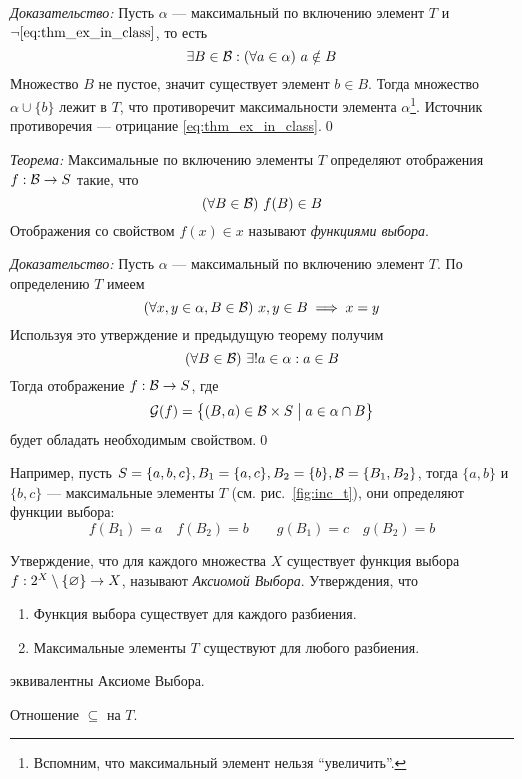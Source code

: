 {\it Доказательство:}
Пусть $\alpha$ --- максимальный по включению элемент $T$ и
$\lnot\eqref{eq:thm_ex_in_class}$, то есть
\[
  \exists B\in\mathcal B:(\forall a\in\alpha)~a\notin B
\]
Множество $B$ не пустое, значит существует элемент $b\in B$.
Тогда множество $\alpha\cup \{b\}$ лежит в $T$, что противоречит
максимальности элемента $\alpha$\footnote{Вспомним, что максимальный элемент
  нельзя ``увеличить''.}.
Источник противоречия --- отрицание \eqref{eq:thm_ex_in_class}.\qed

\vspace{1em}
{\it Теорема:} Максимальные по включению элементы $T$ определяют
отображения $f:\mathcal B\to S$ такие, что
\[
  (\forall B\in\mathcal B)~f(B)\in B
\]
Отображения со свойством $f(x)\in x$ называют {\it функциями выбора}.

{\it Доказательство:} Пусть $\alpha$ --- максимальный по включению
элемент $T$. По определению $T$ имеем
\[
  (\forall x,y\in\alpha,B\in\mathcal B)~x,y\in B\implies x=y
\]
Используя это утверждение и предыдущую теорему получим
\[
  (\forall B\in\mathcal B)~\exists !a\in\alpha:a\in B
\]
Тогда отображение $f:\mathcal B\to S$, где
\[
  \mathcal G(f)=\left\{(B,a)\in \mathcal B\times S\;\big|\; a\in\alpha\cap B\right\}
\]
будет обладать необходимым свойством.\qed

Например, пусть ${S=\{a,b,c\}, B_1=\{a,c\}, B_2=\{b\},\mathcal B=\{B_1,B_2\}}$,
тогда $\{a,b\}$ и $\{b,c\}$ --- максимальные элементы $T$
(см. рис.~\ref{fig:inc_t}),
они определяют функции выбора:
\[
  f(B_1)=a\quad f(B_2)=b\qquad g(B_1)=c\quad g(B_2)=b
\]

Утверждение, что для каждого множества $X$ существует функция
выбора $f:2^{X}\setminus\{\varnothing\}\to X$,
называют {\it Аксиомой Выбора}.
Утверждения, что
\begin{enumerate}
  \item{}Функция выбора существует для каждого разбиения.
  \item{}Максимальные элементы $T$ существуют для любого разбиения.
\end{enumerate}
эквивалентны Аксиоме Выбора.

\begin{marginfigure}[-9cm]
  \center

  \caption{Отношение $\subseteq$ на $T$.}\label{fig:inc_t}
\end{marginfigure}

